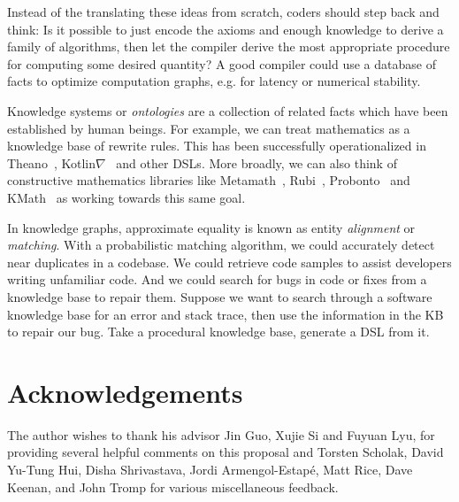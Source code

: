 \documentclass[11pt]{article}
\begin{document}
    Instead of the translating these ideas from scratch, coders should step back and think: Is it possible to just encode the axioms and enough knowledge to derive a family of algorithms, then let the compiler derive the most appropriate procedure for computing some desired quantity? A good compiler could use a database of facts to optimize computation graphs, e.g. for latency or numerical stability.

    Knowledge systems or \textit{ontologies} are a collection of related facts which have been established by human beings. For example, we can treat mathematics as a knowledge base of rewrite rules. This has been successfully operationalized in Theano~\citep{bergstra2010theano}, Kotlin$\nabla$~\citep{considine2019kotlingrad} and other DSLs. More broadly, we can also think of constructive mathematics libraries like Metamath~\citep{megill2006metamath}, Rubi~\citep{rich2009knowledge}, Probonto~\citep{swat2016probonto} and KMath~\citep{nozik2019kotlin} as working towards this same goal.

    In knowledge graphs, approximate equality is known as entity \textit{alignment} or \textit{matching}. With a probabilistic matching algorithm, we could accurately detect near duplicates in a codebase. We could retrieve code samples to assist developers writing unfamiliar code. And we could search for bugs in code or fixes from a knowledge base to repair them. Suppose we want to search through a software knowledge base for an error and stack trace, then use the information in the KB to repair our bug.
    Take a procedural knowledge base, generate a DSL from it.

    \pagebreak \section{Acknowledgements}

    The author wishes to thank his advisor Jin Guo, Xujie Si and Fuyuan Lyu, for providing several helpful comments on this proposal and Torsten Scholak, David Yu-Tung Hui, Disha Shrivastava, Jordi Armengol-Estap\'e, Matt Rice, Dave Keenan, and John Tromp for various miscellaneous feedback.

    
    
\end{document}
